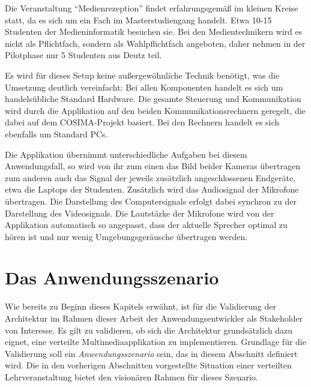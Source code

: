   Die Veranstaltung "`Medienrezeption"' findet erfahrungsgemäß im kleinen Kreise statt, da es sich um ein Fach im Masterstudiengang handelt. Etwa 10-15 Studenten der Medieninformatik besuchen sie. Bei den Medientechnikern wird es nicht als Pflichtfach, sondern als Wahlpflichtfach angeboten, daher nehmen in der Pilotphase nur 5 Studenten aus Deutz teil.

  Es wird für dieses Setup keine außergewöhnliche Technik benötigt, was die Umsetzung deutlich vereinfacht: Bei allen Komponenten handelt es sich um handelsübliche Standard Hardware. Die gesamte Steuerung und Kommunikation wird durch die Applikation auf den beiden Kommunikationsrechnern geregelt, die dabei auf dem COSIMA-Projekt basiert. Bei den Rechnern handelt es sich ebenfalls um Standard PCs.

  Die Applikation übernimmt unterschiedliche Aufgaben bei diesem Anwendungsfall, so wird von ihr zum einen das Bild beider Kameras übertragen zum anderen auch das Signal der jeweils zusätzlich angeschlossenen Endgeräte, etwa die Laptops der Studenten. Zusätzlich wird das Audiosignal der Mikrofone übertragen. Die Darstellung des Computersignals erfolgt dabei synchron zu der Darstellung des Videosignals. Die Lautstärke der Mikrofone wird von der Applikation automatisch so angepasst, dass der aktuelle Sprecher optimal zu hören ist und nur wenig Umgebungsgeräusche übertragen werden.




\section{Das Anwendungsszenario} %
\label{sub:das_anwendungsszenario}

  Wie bereits zu Beginn dieses Kapitels erwähnt, ist für die Validierung der Architektur im Rahmen dieser Arbeit der Anwendungsentwickler als Stakeholder von Interesse. Es gilt zu validieren, ob sich die Architektur grundsätzlich dazu eignet, eine verteilte Multimediaapplikation zu implementieren. Grundlage für die Validierung soll ein \emph{Anwendungsszenario} sein, das in diesem Abschnitt definiert wird. Die in den vorherigen Abschnitten vorgestellte Situation einer verteilten Lehrveranstaltung bietet den visionären Rahmen für dieses Szenario.
  

